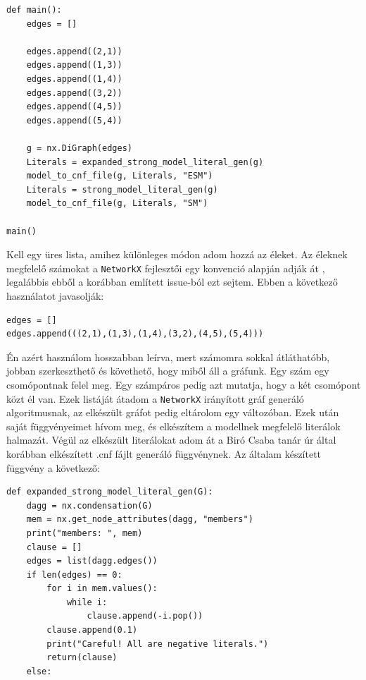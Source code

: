 \documentclass[
]{thesis-ekf}
\theoremstyle{definition}
\theoremstyle{remark}
\begin{document}
	\begin{lstlisting}
def main():
	edges = []
	
	edges.append((2,1))
	edges.append((1,3))
	edges.append((1,4))
	edges.append((3,2))
	edges.append((4,5))
	edges.append((5,4))
	
	g = nx.DiGraph(edges)
	Literals = expanded_strong_model_literal_gen(g)
	model_to_cnf_file(g, Literals, "ESM")
	Literals = strong_model_literal_gen(g)
	model_to_cnf_file(g, Literals, "SM")
	
main()
	\end{lstlisting}

	
	Kell egy üres lista, amihez különleges módon adom hozzá az éleket. Az éleknek megfelelő számokat a \texttt{NetworkX} fejlesztői egy konvenció alapján adják át \cite{link-github-issue}, legalábbis ebből a korábban említett issue-ból ezt sejtem. Ebben a következő használatot javasolják:
	
	\begin{lstlisting}
edges = []
edges.append(((2,1),(1,3),(1,4),(3,2),(4,5),(5,4)))
	\end{lstlisting}
	
	Én azért használom hosszabban leírva, mert számomra sokkal átláthatóbb, jobban szerkeszthető és követhető, hogy miből áll a gráfunk. Egy szám egy csomópontnak felel meg. Egy számpáros pedig azt mutatja, hogy a két csomópont közt él van. Ezek listáját átadom a \texttt{NetworkX} irányított gráf generáló algoritmusnak, az elkészült gráfot pedig eltárolom egy változóban. Ezek után saját függvényeimet hívom meg, és elkészítem a modellnek megfelelő literálok halmazát. Végül az elkészült literálokat adom át a Biró Csaba tanár úr által korábban elkészített .cnf fájlt generáló függvénynek.
	\newpage
	Az általam készített függvény a következő:

	\begin{lstlisting}
def expanded_strong_model_literal_gen(G):
	dagg = nx.condensation(G)
	mem = nx.get_node_attributes(dagg, "members")
	print("members: ", mem)
	clause = []
	edges = list(dagg.edges())
	if len(edges) == 0:
		for i in mem.values():
			while i:
				clause.append(-i.pop())
		clause.append(0.1)
		print("Careful! All are negative literals.")
		return(clause)
	else:
	\end{lstlisting}\label{kod-nx-condensation}
\end{document}
